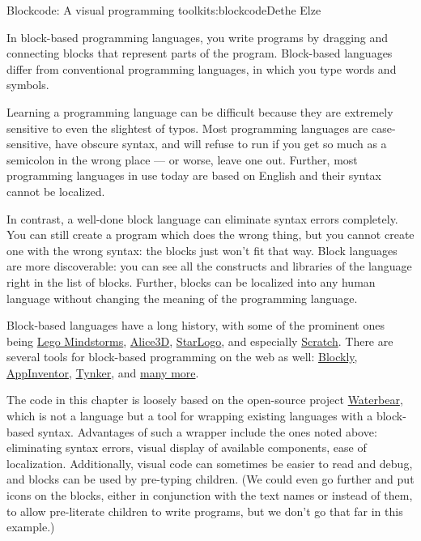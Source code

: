 \begin{aosachapter}{Blockcode: A visual programming toolkit}{s:blockcode}{Dethe Elze}

In block-based programming languages, you write programs by dragging and
connecting blocks that represent parts of the program. Block-based
languages differ from conventional programming languages, in which you
type words and symbols.

Learning a programming language can be difficult because they are
extremely sensitive to even the slightest of typos. Most programming
languages are case-sensitive, have obscure syntax, and will refuse to
run if you get so much as a semicolon in the wrong place --- or worse,
leave one out. Further, most programming languages in use today are
based on English and their syntax cannot be localized.

In contrast, a well-done block language can eliminate syntax errors
completely. You can still create a program which does the wrong thing,
but you cannot create one with the wrong syntax: the blocks just won't
fit that way. Block languages are more discoverable: you can see all the
constructs and libraries of the language right in the list of blocks.
Further, blocks can be localized into any human language without
changing the meaning of the programming language.


Block-based languages have a long history, with some of the prominent
ones being \href{http://www.lego.com/en-us/mindstorms/}{Lego
Mindstorms}, \href{http://www.alice.org/index.php}{Alice3D},
\href{http://education.mit.edu/projects/starlogo-tng}{StarLogo}, and
especially \href{http://scratch.mit.edu/}{Scratch}. There are several
tools for block-based programming on the web as well:
\href{https://developers.google.com/blockly/}{Blockly},
\href{http://appinventor.mit.edu/explore/}{AppInventor},
\href{http://www.tynker.com/}{Tynker}, and
\href{http://en.wikipedia.org/wiki/Visual_programming_language}{many
more}.

The code in this chapter is loosely based on the open-source project
\href{http://waterbearlang.com/}{Waterbear}, which is not a language but
a tool for wrapping existing languages with a block-based syntax.
Advantages of such a wrapper include the ones noted above: eliminating
syntax errors, visual display of available components, ease of
localization. Additionally, visual code can sometimes be easier to read
and debug, and blocks can be used by pre-typing children. (We could even
go further and put icons on the blocks, either in conjunction with the
text names or instead of them, to allow pre-literate children to write
programs, but we don't go that far in this example.)


\end{aosachapter}
